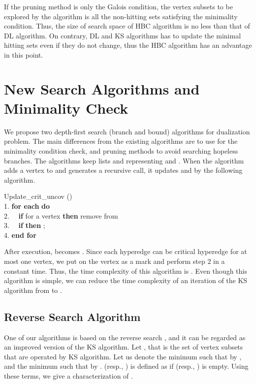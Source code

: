 If the pruning method is only the Galois condition, the vertex subsets
 to be explored by the algorithm is all the non-hitting sets satisfying
 the minimality condition.
Thus, the size of search space of HBC algorithm is no less than that of
 DL algorithm.
On contrary, DL and KS algorithms has to update the minimal hitting sets
 even if they do not change, thus the HBC algorithm has an advantage
 in this point.

\section{New Search Algorithms and Minimality Check}

We propose two depth-first search (branch and bound) algorithms for
 dualization problem.
The main differences from the existing algorithms are to use  for
 the minimality condition check, and pruning methods to avoid searching
 hopeless branches.
The algorithms keep lists  and  representing 
 and .
When the algorithm adds a vertex  to  and generates a recursive call,
 it updates  and  by the following algorithm.

\begin{tabbing}
Update\_crit\_uncov ()\\
1. {\bf for each}  {\bf do}\\
2. \ \ {\bf if}  for a vertex  {\bf then} remove 
 from \\
3. \ \ {\bf if}  {\bf then} ;
 \\
4. {\bf end for}
\end{tabbing}

After execution,  becomes .
Since each hyperedge  can be critical hyperedge for at most one vertex,
 we put  on the vertex as a mark and perform step 2 in a constant time.
Thus, the time complexity of this algorithm is .
Even though this algorithm is simple, we can reduce the time complexity of
 an iteration of the KS algorithm from  to
 .






\subsection{Reverse Search Algorithm}

One of our algorithms is based on the reverse search \cite{AvFk96},
 and it can be regarded as an improved version of the KS algorithm.
Let ,
 that is the set of vertex subsets that are operated by KS algorithm.
Let us denote the minimum  such that  by
 , and the minimum  such that  by
 .
 (resp., ) is defined as  if 
 (resp., ) is empty.
Using these terms, we give a characterization of .

